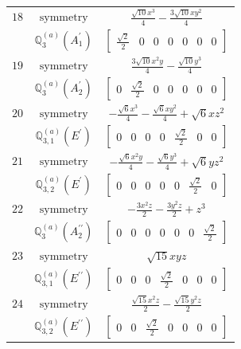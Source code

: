 \documentclass[fleqn,8pt,landscape]{jsarticle}
\begin{document}
\begin{longtable}{ccc}
$ 18 $ & $ \text{symmetry} $ & $ \frac{\sqrt{10} x^{3}}{4} - \frac{3 \sqrt{10} x y^{2}}{4} $ \\
$  $ & $ \mathbb{Q}_{3}^{(a)}(A_{1}^{\prime}) $ & $ \begin{bmatrix} \frac{\sqrt{2}}{2} & 0 & 0 & 0 & 0 & 0 & 0 \end{bmatrix} $ \\ \hline
$ 19 $ & $ \text{symmetry} $ & $ \frac{3 \sqrt{10} x^{2} y}{4} - \frac{\sqrt{10} y^{3}}{4} $ \\
$  $ & $ \mathbb{Q}_{3}^{(a)}(A_{2}^{\prime}) $ & $ \begin{bmatrix} 0 & \frac{\sqrt{2}}{2} & 0 & 0 & 0 & 0 & 0 \end{bmatrix} $ \\ \hline
$ 20 $ & $ \text{symmetry} $ & $ - \frac{\sqrt{6} x^{3}}{4} - \frac{\sqrt{6} x y^{2}}{4} + \sqrt{6} x z^{2} $ \\
$  $ & $ \mathbb{Q}_{3,1}^{(a)}(E^{\prime}) $ & $ \begin{bmatrix} 0 & 0 & 0 & 0 & \frac{\sqrt{2}}{2} & 0 & 0 \end{bmatrix} $ \\ \hline
$ 21 $ & $ \text{symmetry} $ & $ - \frac{\sqrt{6} x^{2} y}{4} - \frac{\sqrt{6} y^{3}}{4} + \sqrt{6} y z^{2} $ \\
$  $ & $ \mathbb{Q}_{3,2}^{(a)}(E^{\prime}) $ & $ \begin{bmatrix} 0 & 0 & 0 & 0 & 0 & \frac{\sqrt{2}}{2} & 0 \end{bmatrix} $ \\ \hline
$ 22 $ & $ \text{symmetry} $ & $ - \frac{3 x^{2} z}{2} - \frac{3 y^{2} z}{2} + z^{3} $ \\
$  $ & $ \mathbb{Q}_{3}^{(a)}(A_{2}^{\prime\prime}) $ & $ \begin{bmatrix} 0 & 0 & 0 & 0 & 0 & 0 & \frac{\sqrt{2}}{2} \end{bmatrix} $ \\ \hline
$ 23 $ & $ \text{symmetry} $ & $ \sqrt{15} x y z $ \\
$  $ & $ \mathbb{Q}_{3,1}^{(a)}(E^{\prime\prime}) $ & $ \begin{bmatrix} 0 & 0 & 0 & \frac{\sqrt{2}}{2} & 0 & 0 & 0 \end{bmatrix} $ \\ \hline
$ 24 $ & $ \text{symmetry} $ & $ \frac{\sqrt{15} x^{2} z}{2} - \frac{\sqrt{15} y^{2} z}{2} $ \\
$  $ & $ \mathbb{Q}_{3,2}^{(a)}(E^{\prime\prime}) $ & $ \begin{bmatrix} 0 & 0 & \frac{\sqrt{2}}{2} & 0 & 0 & 0 & 0 \end{bmatrix} $ \\ \hline

\end{longtable}
\end{document}
